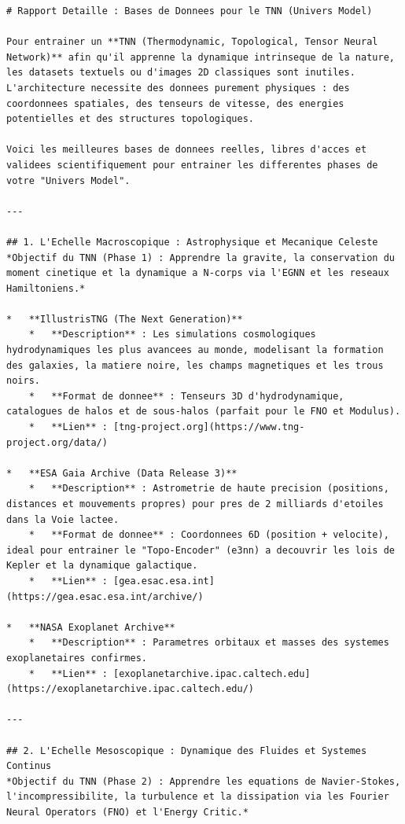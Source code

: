 \documentclass[11pt,a4paper]{article}
\begin{document}
\begin{lstlisting}[language={}, caption={}, basicstyle=\ttfamily\footnotesize, breaklines=true]
# Rapport Detaille : Bases de Donnees pour le TNN (Univers Model)

Pour entrainer un **TNN (Thermodynamic, Topological, Tensor Neural Network)** afin qu'il apprenne la dynamique intrinseque de la nature, les datasets textuels ou d'images 2D classiques sont inutiles. L'architecture necessite des donnees purement physiques : des coordonnees spatiales, des tenseurs de vitesse, des energies potentielles et des structures topologiques.

Voici les meilleures bases de donnees reelles, libres d'acces et validees scientifiquement pour entrainer les differentes phases de votre "Univers Model".

---

## 1. L'Echelle Macroscopique : Astrophysique et Mecanique Celeste
*Objectif du TNN (Phase 1) : Apprendre la gravite, la conservation du moment cinetique et la dynamique a N-corps via l'EGNN et les reseaux Hamiltoniens.*

*   **IllustrisTNG (The Next Generation)**
    *   **Description** : Les simulations cosmologiques hydrodynamiques les plus avancees au monde, modelisant la formation des galaxies, la matiere noire, les champs magnetiques et les trous noirs.
    *   **Format de donnee** : Tenseurs 3D d'hydrodynamique, catalogues de halos et de sous-halos (parfait pour le FNO et Modulus).
    *   **Lien** : [tng-project.org](https://www.tng-project.org/data/)

*   **ESA Gaia Archive (Data Release 3)**
    *   **Description** : Astrometrie de haute precision (positions, distances et mouvements propres) pour pres de 2 milliards d'etoiles dans la Voie lactee.
    *   **Format de donnee** : Coordonnees 6D (position + velocite), ideal pour entrainer le "Topo-Encoder" (e3nn) a decouvrir les lois de Kepler et la dynamique galactique.
    *   **Lien** : [gea.esac.esa.int](https://gea.esac.esa.int/archive/)

*   **NASA Exoplanet Archive**
    *   **Description** : Parametres orbitaux et masses des systemes exoplanetaires confirmes.
    *   **Lien** : [exoplanetarchive.ipac.caltech.edu](https://exoplanetarchive.ipac.caltech.edu/)

---

## 2. L'Echelle Mesoscopique : Dynamique des Fluides et Systemes Continus
*Objectif du TNN (Phase 2) : Apprendre les equations de Navier-Stokes, l'incompressibilite, la turbulence et la dissipation via les Fourier Neural Operators (FNO) et l'Energy Critic.*


\end{lstlisting}
\end{document}
